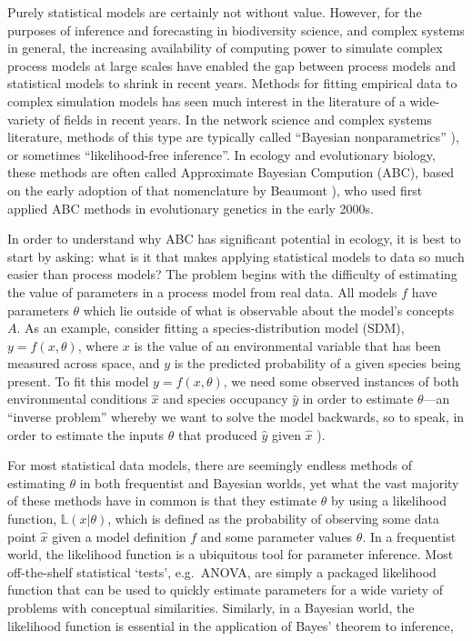 \documentclass[]{article}
\begin{document}
Purely statistical models are certainly not without value. However, for
the purposes of inference and forecasting in biodiversity science, and
complex systems in general, the increasing availability of computing
power to simulate complex process models at large scales have enabled
the gap between process models and statistical models to shrink in
recent years. Methods for fitting empirical data to complex simulation
models has seen much interest in the literature of a wide-variety of
fields in recent years. In the network science and complex systems
literature, methods of this type are typically called ``Bayesian
nonparametrics'' \citep{orbanz_bayesian_2015}), or sometimes ``likelihood-free
inference''. In ecology and evolutionary biology, these methods are
often called Approximate Bayesian Compution (ABC), based on the early
adoption of that nomenclature by Beaumont \citep{beaumont_approximate_2019}), who
used first applied ABC methods in evolutionary genetics in the early 2000s.

In order to understand why ABC has significant potential in ecology, it
is best to start by asking: what is it that makes applying statistical
models to data so much easier than process models? The problem begins
with the difficulty of estimating the value of parameters in a process
model from real data. All models \(f\) have parameters \(\theta\) which
lie outside of what is observable about the model's concepts \(A\). As
an example, consider fitting a species-distribution model (SDM),
\(y = f(x, \theta)\), where \(x\) is the value of an environmental
variable that has been measured across space, and \(y\) is the predicted
probability of a given species being present. To fit this model
\(y =f(x, \theta)\), we need some observed instances of both
environmental conditions \(\hat{x}\) and species occupancy \(\hat{y}\)
in order to estimate \(\theta\)---an ``inverse problem'' whereby we want
to solve the model backwards, so to speak, in order to estimate the
inputs \(\theta\) that produced \(\hat{y}\) given \(\hat{x}\)
\citep{stouffer_all_2019}).

For most statistical data models, there are seemingly endless methods of
estimating \(\theta\) in both frequentist and Bayesian worlds, yet what
the vast majority of these methods have in common is that they estimate
\(\theta\) by using a likelihood function, \(\mathbb{L}({x} | \theta)\),
which is defined as the probability of observing some data point
\(\hat{x}\) given a model definition \(f\) and some parameter values
\(\theta\). In a frequentist world, the likelihood function is a
ubiquitous tool for parameter inference. Most off-the-shelf statistical
`tests', e.g.~ANOVA, are simply a packaged likelihood function that can
be used to quickly estimate parameters for a wide variety of problems
with conceptual similarities. Similarly, in a Bayesian world, the
likelihood function is essential in the application of Bayes' theorem to
inference,
\end{document}
